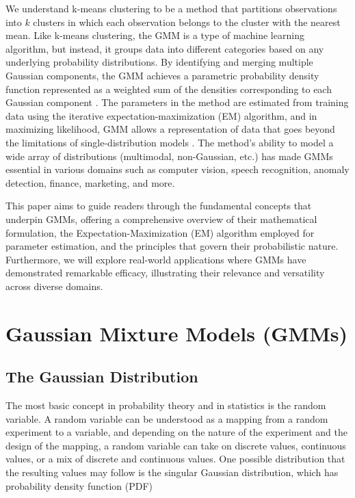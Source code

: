 \documentclass[12pt]{article}
\begin{document}
We understand k-means clustering to be a method that partitions
observations into \(k\) clusters in which each observation belongs to
the cluster with the nearest mean. Like k-means clustering, the GMM is a
type of machine learning algorithm, but instead, it groups data into
different categories based on any underlying probability distributions.
By identifying and merging multiple Gaussian components, the GMM
achieves a parametric probability density function represented as a
weighted sum of the densities corresponding to each Gaussian component
\citep{reynolds2009gaussian}. The parameters in the method are estimated
from training data using the iterative expectation-maximization (EM)
algorithm, and in maximizing likelihood, GMM allows a representation of
data that goes beyond the limitations of single-distribution models
\citep{bouguila2020mixture}. The method's ability to model a wide array
of distributions (multimodal, non-Gaussian, etc.) has made GMMs
essential in various domains such as computer vision, speech
recognition, anomaly detection, finance, marketing, and more.

This paper aims to guide readers through the fundamental concepts that
underpin GMMs, offering a comprehensive overview of their mathematical
formulation, the Expectation-Maximization (EM) algorithm employed for
parameter estimation, and the principles that govern their probabilistic
nature. Furthermore, we will explore real-world applications where GMMs
have demonstrated remarkable efficacy, illustrating their relevance and
versatility across diverse domains.

\hypertarget{gaussian-mixture-models-gmms}{%
\section{Gaussian Mixture Models
(GMMs)}\label{gaussian-mixture-models-gmms}}

\label{sec:background}

\hypertarget{the-gaussian-distribution}{%
\subsection{The Gaussian Distribution}\label{the-gaussian-distribution}}

The most basic concept in probability theory and in statistics is the
random variable. A random variable can be understood as a mapping from a
random experiment to a variable, and depending on the nature of the
experiment and the design of the mapping, a random variable can take on
discrete values, continuous values, or a mix of discrete and continuous
values. One possible distribution that the resulting values may follow
is the singular Gaussian distribution, which has probability density
function (PDF)
\end{document}
